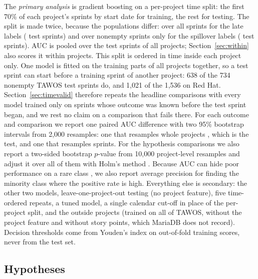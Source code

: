 The \emph{primary analysis} is gradient boosting on a per-project time split: the first 70\% of each project's sprints by start date for training, the rest for testing. The split is made twice, because the populations differ: over all sprints for the late labels (\TestAll{} test sprints) and over nonempty sprints only for the spillover labels (\TestNonempty{} test sprints). AUC is pooled over the test sprints of all projects; Section~\ref{sec:within} also scores it within projects. This split is ordered in time inside each project only. One model is fitted on the training parts of all projects together, so a test sprint can start before a training sprint of another project: 638 of the 734 nonempty TAWOS test sprints do, and 1,021 of the 1,536 on Red Hat. Section~\ref{sec:timevalid} therefore repeats the headline comparisons with every model trained only on sprints whose outcome was known before the test sprint began, and we rest no claim on a comparison that fails there. For each outcome and comparison we report one paired AUC difference with two 95\% bootstrap intervals from 2,000 resamples: one that resamples whole projects \cite{field2007}, which is the test, and one that resamples sprints. For the hypothesis comparisons we also report a two-sided bootstrap $p$-value from 10,000 project-level resamples and adjust it over all of them with Holm's method \cite{holm1979}. Because AUC can hide poor performance on a rare class \cite{davis2006}, we also report average precision for finding the minority class where the positive rate is high. Everything else is secondary: the other two models, leave-one-project-out testing (no project feature), five time-ordered repeats, a tuned model, a single calendar cut-off in place of the per-project split, and the outside projects (trained on all of TAWOS, without the project feature and without story points, which MariaDB does not record). Decision thresholds come from Youden's index \cite{youden1950} on out-of-fold training scores, never from the test set.

\subsection{Hypotheses}

